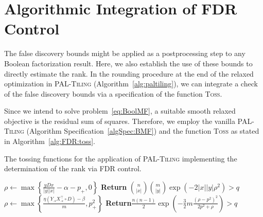 \section{Algorithmic Integration of FDR Control}\label{sec:TP:algorithmicIntegration}
The false discovery bounds might be applied as a postprocessing step to any Boolean factorization result. Here, we also establish the use of these bounds to directly estimate the rank.
In the rounding procedure at the end of the relaxed optimization in \textsc{PAL-Tiling} (Algorithm~\ref{alg:paltiling}), we can integrate a check of the false discovery bounds via a specification of the function \textsc{Toss}.
 
Since we intend to solve problem~\eqref{eq:BoolMF}, a suitable smooth relaxed objective is the residual sum of squares. Therefore, we employ the vanilla \textsc{PAL-Tiling} (Algorithm Specification~\ref{algSpec:BMF}) and the function \textsc{Toss} as stated in Algorithm~\ref{alg:FDR:toss}.
\begin{algorithm}[t]
\caption{The tossing functions for the application of \textsc{PAL-Tiling} implementing the determination of the rank via FDR control.}
\begin{algorithmic}[1]
{}
    \State $\displaystyle\rho\gets\max\left\{\frac{yDx}{\lvert y\rvert \lvert x\rvert } -\alpha -p_+,0\right\}$
    \State \textbf{Return} $\displaystyle\binom{n}{\lvert x\rvert }\binom{m}{\lvert y\rvert }\exp\left(-2\lvert x\rvert \lvert y\rvert \rho^2\right)>q$
\EndFunction
\State
{}
    \State $\displaystyle\rho\gets\max\left\{\frac{\eta\left(Y_{\cdot s}X_{\cdot s}^\top\circ D\right)-\beta}{m}, p_+^2\right\}$
    \State \textbf{Return}$\displaystyle\frac{n(n-1)}{2}\exp\left(-\frac{3}{2}m\frac{(\rho-p^2)^2}{2p^2+\rho}\right)>q$ 
\EndFunction
\end{algorithmic}
\label{alg:FDR:toss}
\end{algorithm}
